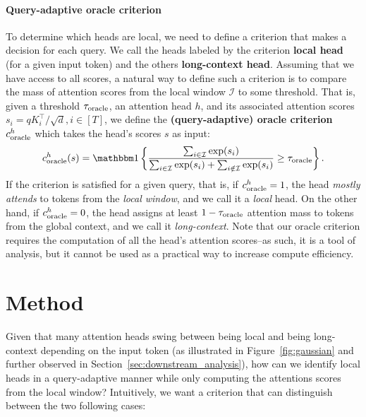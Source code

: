  \paragraph{Query-adaptive oracle criterion} 
 To determine which heads are local, we need to define a criterion that makes a decision for each query. 
 We call the heads labeled by the criterion  \textbf{local head} (for a given input token) and the others \textbf{long-context head}.
Assuming that we have access to all scores, a natural way to define such a criterion is to compare the mass of attention scores from the local window $\mathcal I$ to some threshold. That is, given a threshold $\tau_{\text{oracle}}$, an attention head $h$, and its associated attention scores $s_i = q K_i^\top/\sqrt{d}, i\in [T]$, we define the \textbf{(query-adaptive) oracle criterion}  $c^h_{\text{oracle}}$ which takes the head's scores $s$ as input:
\begin{equation}
\label{eq:oracle}
    \oraclecriterion(s) = \indicator{ \frac{\sum_{i\in \mathcal I} \exp(s_i)}{\sum_{i \in \mathcal I} \exp(s_i)  +\sum_{i \notin \mathcal I} \exp(s_i) } \geq \thrsoracle}.
\end{equation}
If the criterion is satisfied for a given query, that is, if $c^h_{\text{oracle}}=1$, the head \textit{mostly attends} to tokens from the \textit{local window}, and we call it a \textit{local} head. On the other hand, if  $c^h_{\text{oracle}}=0$, the head assigns at least $1-\tau_{\text{oracle}}$ attention mass to tokens from the global context, and we call it \textit{long-context}. Note that our oracle criterion requires the computation of all the head's attention scores--as such, it is a tool of analysis, but it cannot be used as a practical way to increase compute efficiency.





















\section{Method}
\label{sec:method}
Given that many attention heads swing between being local and being long-context depending on the input token (as illustrated in Figure~\ref{fig:gaussian} and further observed in Section~\ref{sec:downstream_analysis}), how can we identify local heads in a query-adaptive manner while only computing the attentions scores from the local window? Intuitively, we want a criterion that can distinguish between the two following cases:

